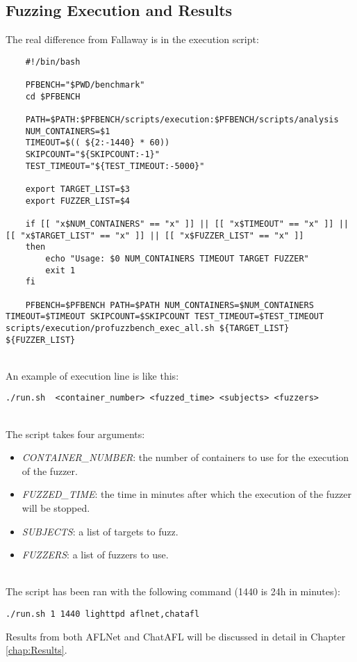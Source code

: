 \subsection{Fuzzing Execution and Results}

The real difference from Fallaway is in the execution script:\\
\begin{lstlisting}
    #!/bin/bash

    PFBENCH="$PWD/benchmark"
    cd $PFBENCH

    PATH=$PATH:$PFBENCH/scripts/execution:$PFBENCH/scripts/analysis
    NUM_CONTAINERS=$1
    TIMEOUT=$(( ${2:-1440} * 60))
    SKIPCOUNT="${SKIPCOUNT:-1}"
    TEST_TIMEOUT="${TEST_TIMEOUT:-5000}"

    export TARGET_LIST=$3
    export FUZZER_LIST=$4

    if [[ "x$NUM_CONTAINERS" == "x" ]] || [[ "x$TIMEOUT" == "x" ]] || [[ "x$TARGET_LIST" == "x" ]] || [[ "x$FUZZER_LIST" == "x" ]]
    then
        echo "Usage: $0 NUM_CONTAINERS TIMEOUT TARGET FUZZER"
        exit 1
    fi

    PFBENCH=$PFBENCH PATH=$PATH NUM_CONTAINERS=$NUM_CONTAINERS TIMEOUT=$TIMEOUT SKIPCOUNT=$SKIPCOUNT TEST_TIMEOUT=$TEST_TIMEOUT scripts/execution/profuzzbench_exec_all.sh ${TARGET_LIST} ${FUZZER_LIST}
\end{lstlisting}
\phantom{}\\
An example of execution line is like this:\\
\begin{lstlisting}
./run.sh  <container_number> <fuzzed_time> <subjects> <fuzzers>
\end{lstlisting}
\phantom{}\\
The script takes four arguments:\\
\begin{itemize}
    \item \textit{CONTAINER\_NUMBER}: the number of containers to use for the execution of the fuzzer.
    \item \textit{FUZZED\_TIME}: the time in minutes after which the execution of the fuzzer will be stopped.
    \item \textit{SUBJECTS}: a list of targets to fuzz.
    \item \textit{FUZZERS}: a list of fuzzers to use.
\end{itemize}
\phantom{}\\
The script has been ran with the following command (1440 is 24h in minutes):
\begin{lstlisting}
./run.sh 1 1440 lighttpd aflnet,chatafl
\end{lstlisting}
Results from both AFLNet and ChatAFL will be discussed in detail in Chapter \ref{chap:Results}.